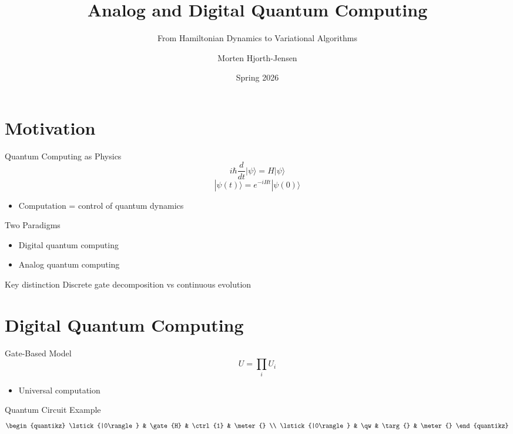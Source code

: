 \documentclass{beamer}
\title{Analog and Digital Quantum Computing}
\subtitle{From Hamiltonian Dynamics to Variational Algorithms}
\author{Morten Hjorth-Jensen}
\date{Spring 2026}
\begin{document}
\frame{\titlepage}

\section{Motivation}

\begin{frame}{Quantum Computing as Physics}
\[
i\hbar \frac{d}{dt} |\psi\rangle = H |\psi\rangle
\]
\[
|\psi(t)\rangle = e^{-iHt}|\psi(0)\rangle
\]

\begin{itemize}
\item Computation = control of quantum dynamics
\end{itemize}
\end{frame}


\begin{frame}{Two Paradigms}
\begin{itemize}
\item Digital quantum computing
\item Analog quantum computing
\end{itemize}

\begin{block}{Key distinction}
Discrete gate decomposition vs continuous evolution
\end{block}
\end{frame}

\section{Digital Quantum Computing}

\begin{frame}{Gate-Based Model}
\[
U = \prod_i U_i
\]
\begin{itemize}
\item Universal computation
\end{itemize}
\end{frame}


\begin{frame}{Quantum Circuit Example}
\[
\begin{quantikz}
\lstick{|0\rangle} & \gate{H} & \ctrl{1} & \meter{} \\
\lstick{|0\rangle} & \qw & \targ{} & \meter{}
\end{quantikz}
\]
\end{frame}
\end{document}
